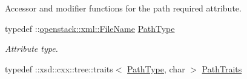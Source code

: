Accessor and modifier functions for the path required attribute. \begin{DoxyCompactItemize}
\item 
\hypertarget{classopenstack_1_1xml_1_1File_a68799b968d6a1c616b7a44c3deae68a5}{
typedef ::\hyperlink{classopenstack_1_1xml_1_1FileName}{openstack::xml::FileName} \hyperlink{classopenstack_1_1xml_1_1File_a68799b968d6a1c616b7a44c3deae68a5}{PathType}}
\label{classopenstack_1_1xml_1_1File_a68799b968d6a1c616b7a44c3deae68a5}

\begin{DoxyCompactList}\small\item\em Attribute type. \item\end{DoxyCompactList}\item 
\hypertarget{classopenstack_1_1xml_1_1File_afb7cd754389fcaf78e46a6a7ceea67e9}{
typedef ::xsd::cxx::tree::traits$<$ \hyperlink{classopenstack_1_1xml_1_1FileName}{PathType}, char $>$ \hyperlink{classopenstack_1_1xml_1_1File_afb7cd754389fcaf78e46a6a7ceea67e9}{PathTraits}}
\label{classopenstack_1_1xml_1_1File_afb7cd754389fcaf78e46a6a7ceea67e9}


\end{DoxyCompactItemize}
